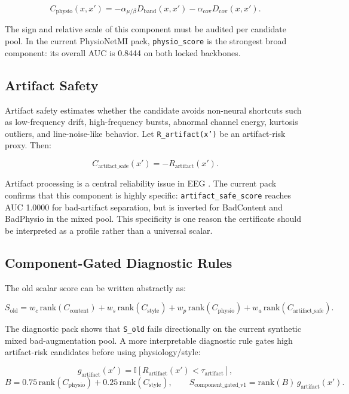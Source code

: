 \documentclass[11pt]{article}
\begin{document}
\[
C_{\mathrm{physio}}(x,x') =
-\alpha_{\mu/\beta}D_{\mathrm{band}}(x,x')
-\alpha_{\mathrm{cov}}D_{\mathrm{cov}}(x,x').
\]

The sign and relative scale of this component must be audited per candidate pool. In the current PhysioNetMI pack, \texttt{physio\_score} is the strongest broad component: its overall AUC is 0.8444 on both locked backbones.

\subsection{Artifact Safety}

Artifact safety estimates whether the candidate avoids non-neural shortcuts such as low-frequency drift, high-frequency bursts, abnormal channel energy, kurtosis outliers, and line-noise-like behavior. Let \texttt{R\_artifact(x')} be an artifact-risk proxy. Then:

\[
C_{\mathrm{artifact\_safe}}(x')=-R_{\mathrm{artifact}}(x').
\]

Artifact processing is a central reliability issue in EEG \cite{Sawangjai2022EEGANet,Winkler2011ICArtifact}. The current pack confirms that this component is highly specific: \texttt{artifact\_safe\_score} reaches AUC 1.0000 for bad-artifact separation, but is inverted for BadContent and BadPhysio in the mixed pool. This specificity is one reason the certificate should be interpreted as a profile rather than a universal scalar.

\subsection{Component-Gated Diagnostic Rules}

The old scalar score can be written abstractly as:

\[
S_{\mathrm{old}} =
w_c\,\mathrm{rank}(C_{\mathrm{content}})
+w_s\,\mathrm{rank}(C_{\mathrm{style}})
+w_p\,\mathrm{rank}(C_{\mathrm{physio}})
+w_a\,\mathrm{rank}(C_{\mathrm{artifact\_safe}}).
\]

The diagnostic pack shows that \texttt{S\_old} fails directionally on the current synthetic mixed bad-augmentation pool. A more interpretable diagnostic rule gates high artifact-risk candidates before using physiology/style:

\[
g_{\mathrm{artifact}}(x') =
\mathbb{I}\left[R_{\mathrm{artifact}}(x')<\tau_{\mathrm{artifact}}\right],
\]
\[
B = 0.75\,\mathrm{rank}(C_{\mathrm{physio}})
+0.25\,\mathrm{rank}(C_{\mathrm{style}}),
\qquad
S_{\mathrm{component\_gated\_v1}}=\mathrm{rank}(B)\,g_{\mathrm{artifact}}(x').
\]
\end{document}
